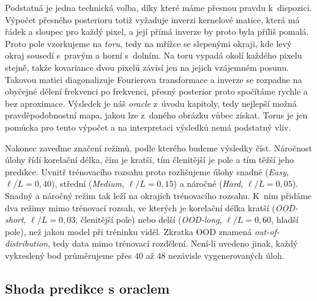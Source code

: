 Podstatná je jedna technická volba, díky které máme přesnou pravdu k~dispozici.
Výpočet přesného posterioru totiž vyžaduje inverzi kernelové matice, která má řádek a sloupec pro každý pixel, a její přímá inverze by proto byla příliš pomalá.
Proto pole vzorkujeme na \emph{toru}, tedy na mřížce se slepenými okraji, kde levý okraj sousedí s~pravým a horní s~dolním.
Na toru vypadá okolí každého pixelu stejně, takže kovariance dvou pixelů závisí jen na jejich vzájemném posunu.
Takovou matici diagonalizuje Fourierova transformace a inverze se rozpadne na obyčejné dělení frekvenci po frekvenci, přesný posterior proto spočítáme rychle a bez aproximace.
Výsledek je náš \emph{oracle} z~úvodu kapitoly, tedy nejlepší možná pravděpodobnostní mapa, jakou lze z~daného obrázku vůbec získat.
Torus je jen pomůcka pro tento výpočet a na interpretaci výsledků nemá podstatný vliv.
\par

Nakonec zaveďme značení režimů, podle kterého budeme výsledky číst.
Náročnost úlohy řídí korelační délka, čím je kratší, tím členitější je pole a tím těžší jeho predikce.
Uvnitř trénovacího rozsahu proto rozlišujeme úlohy snadné (\emph{Easy}, $\ell/L = 0{,}40$), střední (\emph{Medium}, $\ell/L = 0{,}15$) a náročné (\emph{Hard}, $\ell/L = 0{,}05$).
Snadný a náročný režim tak leží na okrajích trénovacího rozsahu.
K~nim přidáme dva režimy mimo trénovací rozsah, ve kterých je korelační délka kratší (\emph{OOD-short}, $\ell/L = 0{,}03$, členitější pole) nebo delší (\emph{OOD-long}, $\ell/L = 0{,}60$, hladší pole), než jakou model při tréninku viděl.
Zkratka OOD znamená \emph{out-of-distribution}, tedy data mimo trénovací rozdělení.
Není-li uvedeno jinak, každý vykreslený bod průměrujeme přes $40$ až $48$ nezávisle vygenerovaných úloh.
\par

\subsection{Shoda predikce s oraclem}
\label{subsec:seg-c-fidelita}

